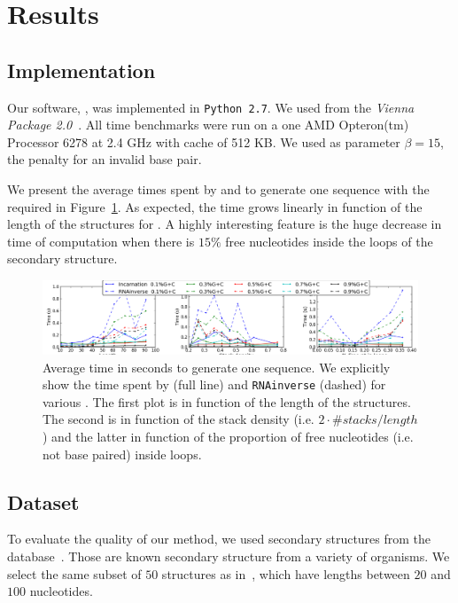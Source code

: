 \section{Results}
\label{sec:results}

\subsection{Implementation}
\label{sec:implementation}
Our software, \ourprog, was implemented in {\tt Python~2.7}. We used
\RNAinverse from the \textit{Vienna Package 2.0}~\cite{Hofacker:1994}.
All time benchmarks were run on a one AMD Opteron(tm) Processor 6278  at 2.4 GHz with cache of 512 KB.
 We used as parameter $\beta=15$, the penalty for an invalid base pair.



We present the average times spent by \ourprog and \RNAinverse to generate one sequence
with the required \GCContent in Figure~\ref{fig:time}. As expected, the time grows linearly
in function of the length of the structures for \ourprog.  A highly interesting feature
is the huge decrease in time of computation when there is $15\%$ free 
nucleotides inside the loops of the secondary structure.

\begin{figure}[ht!]
	\centering
	\includegraphics[width=\textwidth]{Figures/time_rnastrand_clustered_rnainverse_100samples_fix}
	\caption{Average time in seconds to generate one sequence. We explicitly show 
	the time spent by \ourprog (full line) and \texttt{RNAinverse} (dashed) for various \GCContent. The first plot is in function
	of the length of the structures. The second is in function of the stack
	density (i.e. $2\cdot\#stacks/length$) and the latter in function of 
	the proportion of free nucleotides (i.e. not base paired) inside loops.}
	\label{fig:time}	
\end{figure}



\subsection{Dataset}
To evaluate the quality of our method, we used secondary
structures from the \RNASTRAND database~\cite{andronescu2008rna}.
Those are known secondary structure from a variety of organisms.
We select the same subset of $50$ structures as in~\cite{Levin:2012kx}, 
which have lengths between $20$ and $100$ nucleotides. 

